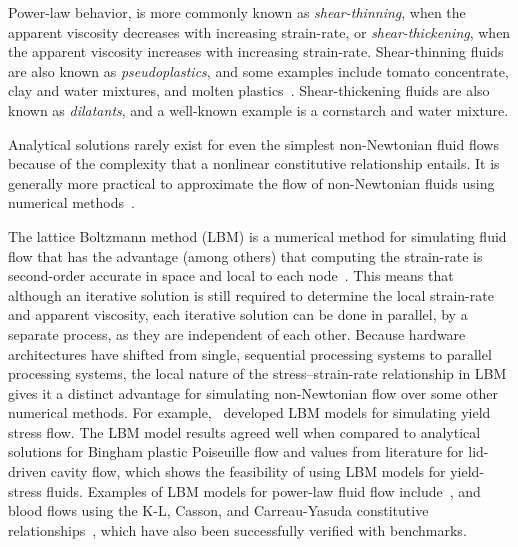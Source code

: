 Power-law behavior, is more commonly known as \emph{shear-thinning}, when the apparent viscosity decreases with increasing strain-rate, or \emph{shear-thickening}, when the apparent viscosity increases with increasing strain-rate.
Shear-thinning fluids are also known as \emph{pseudoplastics}, and some examples include tomato concentrate, clay and water mixtures, and molten plastics~\cite{irgens2014rheology}.
Shear-thickening fluids are also known as \emph{dilatants}, and a well-known example is a cornstarch and water mixture.

\label{sec:lbm-for-nnf}

Analytical solutions rarely exist for even the simplest non-Newtonian fluid flows because of the complexity that a nonlinear constitutive relationship entails.
It is generally more practical to approximate the flow of non-Newtonian fluids using numerical methods~\cite{syrakos2014performance,owens2002computational,chai2011multiple}.

The lattice Boltzmann method (LBM) is a numerical method for simulating fluid flow that has the advantage (among others) that computing the strain-rate is second-order accurate in space and local to each node~\cite{kruger2010second}.
This means that although an iterative solution is still required to determine the local strain-rate and apparent viscosity, each iterative solution can be done in parallel, by a separate process, as they are independent of each other.
Because hardware architectures have shifted from single, sequential processing systems to parallel processing systems, the local nature of the stress--strain-rate relationship in LBM gives it a distinct advantage for simulating non-Newtonian flow over some other numerical methods.
For example,~\cite{tang2011bingham,chai2011multiple,fallah2012multiple,chen2014simulations,vikhansky2008lattice,wang2008lattice} developed LBM models for simulating yield stress flow.
The LBM model results agreed well when compared to analytical solutions for Bingham plastic Poiseuille flow and values from literature for lid-driven cavity flow, which shows the feasibility of using LBM models for yield-stress fluids.
Examples of LBM models for power-law fluid flow include~\cite{wang2011lattice,wang2015localized,boyd2006second,chai2011multiple}, and blood flows using the K-L, Casson, and Carreau-Yasuda constitutive relationships~\cite{ashrafizaadeh2009comparison}, which have also been successfully verified with benchmarks.

